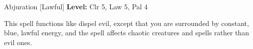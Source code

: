 {Abjuration [Lawful]}
{
	\textbf{Level:}
	Clr 5, Law 5, Pal 4\\
}
{
	This spell functions like dispel evil, except that you are surrounded by constant, blue, lawful energy, and the spell affects chaotic creatures and spells rather than evil ones.

}
